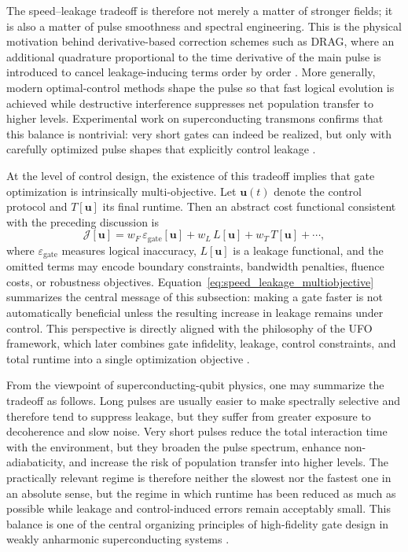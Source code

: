 The speed--leakage tradeoff is therefore not merely a matter of stronger fields; it is also a matter of pulse smoothness and spectral engineering. This is the physical motivation behind derivative-based correction schemes such as DRAG, where an additional quadrature proportional to the time derivative of the main pulse is introduced to cancel leakage-inducing terms order by order \cite{Motzoi2009,Gambetta2011}. More generally, modern optimal-control methods shape the pulse so that fast logical evolution is achieved while destructive interference suppresses net population transfer to higher levels. Experimental work on superconducting transmons confirms that this balance is nontrivial: very short gates can indeed be realized, but only with carefully optimized pulse shapes that explicitly control leakage \cite{Werninghaus2021}.

At the level of control design, the existence of this tradeoff implies that gate optimization is intrinsically multi-objective. Let $\bm{u}(t)$ denote the control protocol and $T[\bm{u}]$ its final runtime. Then an abstract cost functional consistent with the preceding discussion is
\begin{equation}
\mathcal{J}[\bm{u}]
=
w_{F}\,\varepsilon_{\mathrm{gate}}[\bm{u}]
+
w_{L}\,L[\bm{u}]
+
w_{T}\,T[\bm{u}]
+
\cdots,
\label{eq:speed_leakage_multiobjective}
\end{equation}
where $\varepsilon_{\mathrm{gate}}$ measures logical inaccuracy, $L[\bm{u}]$ is a leakage functional, and the omitted terms may encode boundary constraints, bandwidth penalties, fluence costs, or robustness objectives. Equation~\eqref{eq:speed_leakage_multiobjective} summarizes the central message of this subsection: making a gate faster is not automatically beneficial unless the resulting increase in leakage remains under control. This perspective is directly aligned with the philosophy of the UFO framework, which later combines gate infidelity, leakage, control constraints, and total runtime into a single optimization objective \cite{Niu2019}.

From the viewpoint of superconducting-qubit physics, one may summarize the tradeoff as follows. Long pulses are usually easier to make spectrally selective and therefore tend to suppress leakage, but they suffer from greater exposure to decoherence and slow noise. Very short pulses reduce the total interaction time with the environment, but they broaden the pulse spectrum, enhance non-adiabaticity, and increase the risk of population transfer into higher levels. The practically relevant regime is therefore neither the slowest nor the fastest one in an absolute sense, but the regime in which runtime has been reduced as much as possible while leakage and control-induced errors remain acceptably small. This balance is one of the central organizing principles of high-fidelity gate design in weakly anharmonic superconducting systems \cite{Krantz2019,Werninghaus2021,Niu2019}.



